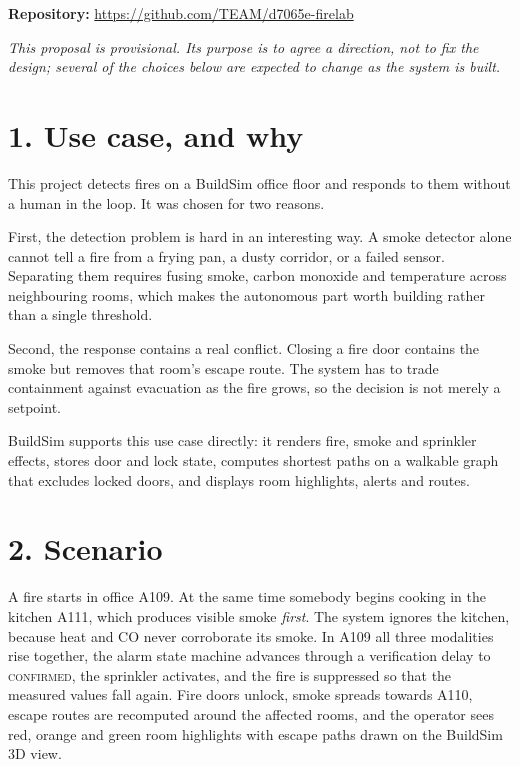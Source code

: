 \begin{center}
\textbf{Repository:} \url{https://github.com/TEAM/d7065e-firelab}
\end{center}

\textit{This proposal is provisional. Its purpose is to agree a direction, not to
fix the design; several of the choices below are expected to change as the system
is built.}

\section{1. Use case, and why}

This project detects fires on a BuildSim office floor and responds to them without
a human in the loop. It was chosen for two reasons.

First, the detection problem is hard in an interesting way. A smoke detector alone
cannot tell a fire from a frying pan, a dusty corridor, or a failed sensor.
Separating them requires fusing smoke, carbon monoxide and temperature across
neighbouring rooms, which makes the autonomous part worth building rather than a
single threshold.

Second, the response contains a real conflict. Closing a fire door contains the
smoke but removes that room's escape route. The system has to trade containment
against evacuation as the fire grows, so the decision is not merely a setpoint.

BuildSim supports this use case directly: it renders fire, smoke and sprinkler
effects, stores door and lock state, computes shortest paths on a walkable graph
that excludes locked doors, and displays room highlights, alerts and routes.

\section{2. Scenario}

A fire starts in office A109. At the same time somebody begins cooking in the
kitchen A111, which produces visible smoke \emph{first}. The system ignores the
kitchen, because heat and CO never corroborate its smoke. In A109 all three
modalities rise together, the alarm state machine advances through a verification
delay to \textsc{confirmed}, the sprinkler activates, and the fire is suppressed so
that the measured values fall again. Fire doors unlock, smoke spreads towards
A110, escape routes are recomputed around the affected rooms, and the operator
sees red, orange and green room highlights with escape paths drawn on the BuildSim
3D view.


